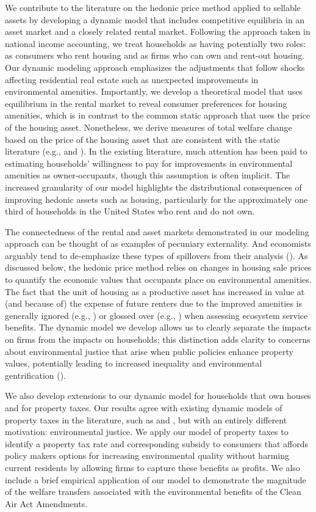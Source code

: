 \documentclass[ecta,nameyear,draft]{econsocart}
\theoremstyle{plain}
\theoremstyle{remark}
\begin{document}
We contribute to the literature on the hedonic price method applied to sellable assets by developing a dynamic model that includes competitive equilibria in an asset market and a closely related rental market. Following the approach taken in national income accounting, we treat households as having potentially two roles: as consumers who rent housing and as firms who can own and rent-out housing. Our dynamic modeling approach emphasizes the adjustments that follow shocks affecting residential real estate such as unexpected improvements in environmental amenities. Importantly, we develop a theoretical model that uses equilibrium in the rental market to reveal consumer preferences for housing amenities, which is in contrast to the common static approach that uses the price of the housing asset. Nonetheless, we derive measures of total welfare change based on the price of the housing asset that are consistent with the static literature (e.g., \cite{freeman99} and \cite{freeman14}). In the existing literature, much attention has been paid to estimating households' willingness to pay for improvements in environmental amenities as owner-occupants, though this assumption is often implicit. The increased granularity of our model highlights the distributional consequences of improving hedonic assets such as housing, particularly for the approximately one third of households in the United States who rent and do not own. 

The connectedness of the rental and asset markets demonstrated in our modeling approach can be thought of as examples of pecuniary externality. And economists arguably tend to de-emphasize these types of spillovers from their analysis (\cite{holcombe01}). As discussed below, the hedonic price method relies on changes in housing sale prices to quantify the economic values that occupants place on environmental amenities. The fact that the unit of housing as a productive asset has increased in value at (and because of) the expense of future renters due to the improved amenities is generally ignored (e.g., \cite{bishop20}) or glossed over (e.g., \cite{banzhaf20}) when assessing ecosystem service benefits. The dynamic model we develop allows us to clearly separate the impacts on firms from the impacts on households; this distinction adds clarity to concerns about environmental justice that arise when public policies enhance property values, potentially leading to increased inequality and environmental gentrification (\cite{banzhafJustice19}). 

We also develop extensions to our dynamic model for households that own houses and for property taxes. Our results agree with existing dynamic models of property taxes in the literature, such as \cite{freeman80} and \cite{poterba84}, but with an entirely different motivation: environmental justice. We apply our model of property taxes to identify a  property tax rate and corresponding subsidy to consumers that affords policy makers options for increasing environmental quality without harming current residents by allowing firms to capture these benefits as profits. We also include a brief empirical application of our model to demonstrate the magnitude of the welfare transfers associated with the environmental benefits of the Clean Air Act Amendments. 
\end{document}
